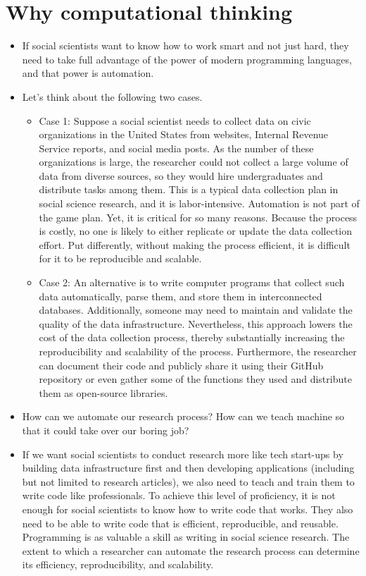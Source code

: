 \documentclass[
]{book}
\begin{document}
\hypertarget{why-computational-thinking}{%
\section{Why computational thinking}\label{why-computational-thinking}}

\begin{itemize}
\item
  If social scientists want to know how to work smart and not just hard, they need to take full advantage of the power of modern programming languages, and that power is automation.
\item
  Let's think about the following two cases.

  \begin{itemize}
  \item
    Case 1: Suppose a social scientist needs to collect data on civic organizations in the United States from websites, Internal Revenue Service reports, and social media posts. As the number of these organizations is large, the researcher could not collect a large volume of data from diverse sources, so they would hire undergraduates and distribute tasks among them. This is a typical data collection plan in social science research, and it is labor-intensive. Automation is not part of the game plan. Yet, it is critical for so many reasons. Because the process is costly, no one is likely to either replicate or update the data collection effort. Put differently, without making the process efficient, it is difficult for it to be reproducible and scalable.
  \item
    Case 2: An alternative is to write computer programs that collect such data automatically, parse them, and store them in interconnected databases. Additionally, someone may need to maintain and validate the quality of the data infrastructure. Nevertheless, this approach lowers the cost of the data collection process, thereby substantially increasing the reproducibility and scalability of the process. Furthermore, the researcher can document their code and publicly share it using their GitHub repository or even gather some of the functions they used and distribute them as open-source libraries.
  \end{itemize}
\item
  How can we automate our research process? How can we teach machine so that it could take over our boring job?
\item
  If we want social scientists to conduct research more like tech start-ups by building data infrastructure first and then developing applications (including but not limited to research articles), we also need to teach and train them to write code like professionals. To achieve this level of proficiency, it is not enough for social scientists to know how to write code that works. They also need to be able to write code that is efficient, reproducible, and reusable. Programming is as valuable a skill as writing in social science research. The extent to which a researcher can automate the research process can determine its efficiency, reproducibility, and scalability.
\end{itemize}
\end{document}

